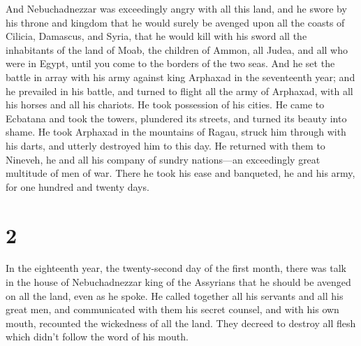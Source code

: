  And Nebuchadnezzar was exceedingly angry with all this
land, and he swore by his throne and kingdom that he would surely be
avenged upon all the coasts of Cilicia, Damascus, and Syria, that he
would kill with his sword all the inhabitants of the land of Moab, the
children of Ammon, all Judea, and all who were in Egypt, until you come
to the borders of the two seas.  And he set the battle in
array with his army against king Arphaxad in the seventeenth year; and
he prevailed in his battle, and turned to flight all the army of
Arphaxad, with all his horses and all his chariots.  He
took possession of his cities. He came to Ecbatana and took the towers,
plundered its streets, and turned its beauty into shame. 
He took Arphaxad in the mountains of Ragau, struck him through with his
darts, and utterly destroyed him to this day.  He returned
with them to Nineveh, he and all his company of sundry nations---an
exceedingly great multitude of men of war. There he took his ease and
banqueted, he and his army, for one hundred and twenty days.

\hypertarget{section-1}{%
\section{2}\label{section-1}}

 In the eighteenth year, the twenty-second day of the first
month, there was talk in the house of Nebuchadnezzar king of the
Assyrians that he should be avenged on all the land, even as he spoke.
 He called together all his servants and all his great men,
and communicated with them his secret counsel, and with his own mouth,
recounted the wickedness of all the land.  They decreed to
destroy all flesh which didn't follow the word of his mouth.

